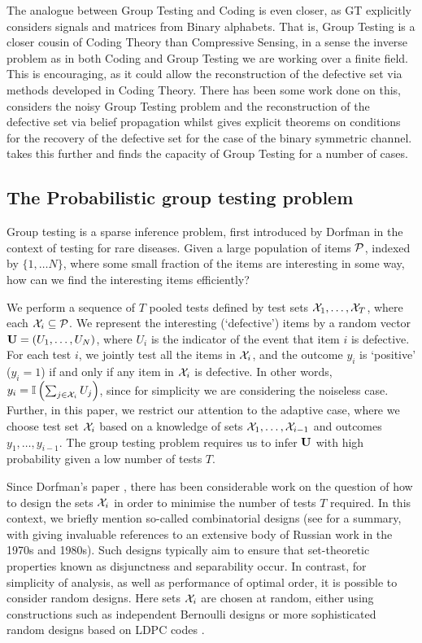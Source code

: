 The analogue between Group Testing and Coding is even closer, as GT explicitly considers signals and matrices from Binary alphabets. That is, Group Testing is a closer cousin of Coding Theory than Compressive Sensing, in a sense the inverse problem as in both Coding and Group Testing we are working over a finite field. This is encouraging, as it could allow the reconstruction of the defective set via methods developed in Coding Theory. There has been some work done on this, \cite{Sejdinovic2010} considers the noisy Group Testing problem and the reconstruction of the defective set via belief propagation whilst \cite{Wadayama} gives explicit theorems on conditions for the recovery of the defective set for the case of the binary symmetric channel. \cite{Baldassini2013} takes this further and finds the capacity of Group Testing for a number of cases. 

\subsection{The Probabilistic group testing problem}
Group testing is a sparse inference problem, first introduced by Dorfman \cite{dorfman} in the context of testing for rare diseases.
Given  a large population of items ${\mathcal{P}}$,
indexed by \( \{1, \ldots N\}\), where
some small fraction of the items are interesting in some way, how can we find the interesting items efficiently? 

We perform a sequence of $T$ pooled tests defined by test sets ${\mathcal{X}}_1, \ldots, {\mathcal{X}}_T$, where each ${\mathcal{X}}_i \subseteq {\mathcal{P}}$. 
We represent the interesting (`defective') items by 
a random vector ${\mathbf{ U}} = ( U_1, \ldots, U_N)$, where $U_i$ is the indicator of the event that item $i$ is defective. 
For each test $i$, we jointly 
test all the items in ${\mathcal{X}}_i$, and the outcome $y_i$ is `positive' ($y_i = 1$) if and only if any item in ${\mathcal{X}}_i$ is defective. In other words, 
$y_i = {\mathbb{I}} \left( \sum_{j \in {\mathcal{X}}_i} U_j \right)$, since for simplicity we are  considering the noiseless case. Further, in this paper, we restrict our attention to
 the adaptive case, where we choose test set
${\mathcal{X}}_i$ based on a knowledge of sets ${\mathcal{X}}_1, \ldots, {\mathcal{X}}_{i-1}$ and outcomes $y_1, \ldots, y_{i-1}$. The group testing problem requires us to infer ${\mathbf{ U}}$ with high
probability given a low number of tests $T$.

Since Dorfman's paper \cite{dorfman}, there has been considerable work on the question of how to design the sets ${\mathcal{X}}_i$ in order to minimise the number of tests $T$
required. In this context, we briefly mention so-called combinatorial designs (see \cite{du, malyutov} for a summary, with \cite{malyutov} giving invaluable
references to an extensive body of Russian work in the 1970s and 1980s). Such designs typically aim to ensure that 
set-theoretic properties known as disjunctness
and separability occur. In contrast, for simplicity of analysis, as well as  performance of optimal order, it is possible to consider random designs. Here sets ${\mathcal{X}}_i$ are chosen
at random, either using constructions such as independent Bernoulli designs \cite{atia, johnsonc8, johnson33} or more sophisticated  random designs based on LDPC codes \cite{Wadayama}. 

